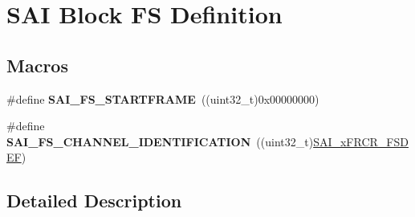 \hypertarget{group___s_a_i___block___f_s___definition}{}\section{S\+AI Block FS Definition}
\label{group___s_a_i___block___f_s___definition}
\subsection*{Macros}
\begin{DoxyCompactItemize}
\item 
\#define {\bfseries S\+A\+I\+\_\+\+F\+S\+\_\+\+S\+T\+A\+R\+T\+F\+R\+A\+ME}~((uint32\+\_\+t)0x00000000)\hypertarget{group___s_a_i___block___f_s___definition_ga33c94a0a362ec1cc07fbbf5f16dedef4}{}\label{group___s_a_i___block___f_s___definition_ga33c94a0a362ec1cc07fbbf5f16dedef4}

\item 
\#define {\bfseries S\+A\+I\+\_\+\+F\+S\+\_\+\+C\+H\+A\+N\+N\+E\+L\+\_\+\+I\+D\+E\+N\+T\+I\+F\+I\+C\+A\+T\+I\+ON}~((uint32\+\_\+t)\hyperlink{group___peripheral___registers___bits___definition_ga7b9e1700cf196e3dec87c1362023ca29}{S\+A\+I\+\_\+x\+F\+R\+C\+R\+\_\+\+F\+S\+D\+EF})\hypertarget{group___s_a_i___block___f_s___definition_ga687285be85aa3830e31cb5b16814dbca}{}\label{group___s_a_i___block___f_s___definition_ga687285be85aa3830e31cb5b16814dbca}

\end{DoxyCompactItemize}


\subsection{Detailed Description}

